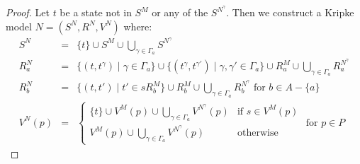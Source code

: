 \begin{proof}
Let $t$ be a state not in $S^M$ or any of the $S^{N^\gamma}$.  Then we construct
a Kripke model $N = (S^N, R^N, V^N)$ where:
\begin{eqnarray*}
S^N &=& \{t\} \cup S^M \cup \bigcup_{\gamma \in \Gamma_a} S^{N^\gamma}\\
R^N_a &=& \{(t, t^\gamma) \mid \gamma \in \Gamma_a\} 
\cup \{(t^\gamma, t^{\gamma'}) \mid \gamma, \gamma' \in \Gamma_a\} 
\cup R^M_a
\cup \bigcup_{\gamma \in \Gamma_a} R^{N^\gamma}_a\\
R^N_b &=& \{(t, t') \mid t' \in sR^M_b\}
\cup R^M_b
\cup \bigcup_{\gamma \in \Gamma_a} R^{N^\gamma}_b \text{ for $b \in A - \{a\}$}\\
V^N(p) &=& 
\begin{cases}
\displaystyle \{t\} \cup V^M(p) \cup \bigcup_{\gamma \in \Gamma_a}
V^{N^\gamma}(p) & \text{if $s \in V^M(p)$}\\
\displaystyle V^M(p) \cup \bigcup_{\gamma \in \Gamma_a} V^{N^\gamma}(p) &
\text{otherwise}
\end{cases}
\text{ for $p \in P$}
\end{eqnarray*}


\end{proof}
